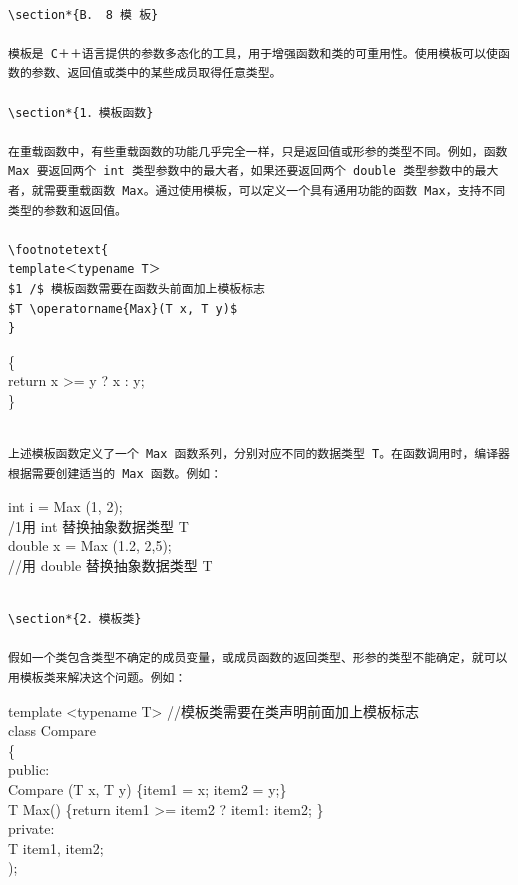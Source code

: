 \documentclass[10pt]{article}
\let\svthefootnote\thefootnote
\newcommand\blfootnotetext[1]{%
  \let\thefootnote\relax\footnote{#1}%
  \addtocounter{footnote}{-1}%
  \let\thefootnote\svthefootnote%
}
\let\svfootnotetext\footnotetext
\renewcommand\footnotetext[2][?]{%
  \if\relax#1\relax%
    \ifnum\value{footnote}=0\blfootnotetext{#2}\else\svfootnotetext{#2}\fi%
  \else%
    \if?#1\ifnum\value{footnote}=0\blfootnotetext{#2}\else\svfootnotetext{#2}\fi%
    \else\svfootnotetext[#1]{#2}\fi%
  \fi
}
\begin{document}
\begin{verbatim}

\section*{B． 8 模 板}

模板是 C＋＋语言提供的参数多态化的工具，用于增强函数和类的可重用性。使用模板可以使函数的参数、返回值或类中的某些成员取得任意类型。

\section*{1．模板函数}

在重载函数中，有些重载函数的功能几乎完全一样，只是返回值或形参的类型不同。例如，函数 Max 要返回两个 int 类型参数中的最大者，如果还要返回两个 double 类型参数中的最大者，就需要重载函数 Max。通过使用模板，可以定义一个具有通用功能的函数 Max，支持不同类型的参数和返回值。

\footnotetext{
template＜typename T＞
$1 /$ 模板函数需要在函数头前面加上模板标志
$T \operatorname{Max}(T x, T y)$
}
\end{verbatim}

\{\\
return x >= y ? x : y;\\
\}

\begin{verbatim}

上述模板函数定义了一个 Max 函数系列，分别对应不同的数据类型 T。在函数调用时，编译器根据需要创建适当的 Max 函数。例如：
\end{verbatim}

int i = Max (1, 2);\\
/1用 int 替换抽象数据类型 T\\
double x = Max (1.2, 2,5);\\
//用 double 替换抽象数据类型 T

\begin{verbatim}

\section*{2．模板类}

假如一个类包含类型不确定的成员变量，或成员函数的返回类型、形参的类型不能确定，就可以用模板类来解决这个问题。例如：
\end{verbatim}

template <typename T> //模板类需要在类声明前面加上模板标志\\
class Compare\\
\{\\
public:\\
Compare (T x, T y) \{item1 = x; item2 = y;\}\\
T Max() \{return item1 >= item2 ? item1: item2; \}\\
private:\\
T item1, item2;\\
);
\end{document}
